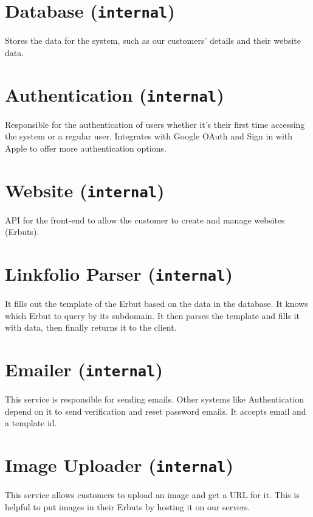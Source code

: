 \documentclass[a4paper]{report}
\begin{document}
\section{Database (\texttt{internal})}

Stores the data for the system, such as our customers’ details and their website data.

\section{Authentication (\texttt{internal})}

Responsible for the authentication of users whether it’s their first time accessing the system or a regular user. Integrates with Google OAuth and Sign in with Apple to offer more authentication options.

\section{Website (\texttt{internal})}

API for the front-end to allow the customer to create and manage websites (Erbuts).

\section{Linkfolio Parser (\texttt{internal})}

It fills out the template of the Erbut based on the data in the database. It knows which Erbut to query by its subdomain. It then parses the template and fills it with data, then finally returns it to the client.

\section{Emailer (\texttt{internal})}

This service is responsible for sending emails. Other systems like Authentication depend on it to send verification and reset password emails. It accepts email and a template id.

\section{Image Uploader (\texttt{internal})}

This service allows customers to upload an image and get a URL for it. This is helpful to put images in their Erbuts by hosting it on our servers.
\end{document}
